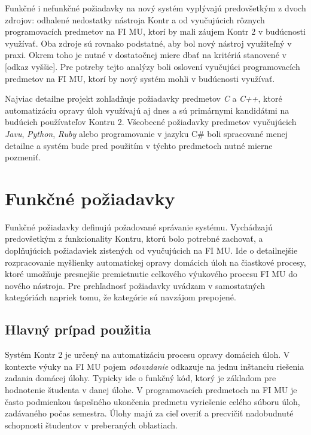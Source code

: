 \documentclass[
  digital, %
  twoside, %
  table,   %
  lof,     %
  lot,     %
]{fithesis3}
\begin{document}
Funkčné i nefunkčné požiadavky na nový systém vyplývajú predovšetkým z dvoch zdrojov: odhalené nedostatky nástroja Kontr a od vyučujúcich rôznych programovacích predmetov na FI MU, ktorí by mali záujem Kontr 2 v budúcnosti využívať. Oba zdroje sú rovnako podstatné, aby bol nový nástroj využiteľný v praxi. Okrem toho je nutné v dostatočnej miere dbať na kritériá stanovené v [odkaz vyššie]. Pre potreby tejto analýzy boli oslovení vyučujúci programovacích predmetov na FI MU, ktorí by nový systém mohli v budúcnosti využívať. 

Najviac detailne projekt zohľadňuje požiadavky predmetov \emph{C} a \emph{C++}, ktoré automatizáciu opravy úloh využívajú aj dnes a sú primárnymi kandidátmi na budúcich používateľov Kontru 2. Všeobecné požiadavky predmetov vyučujúcich \emph{Javu}, \emph{Python}, \emph{Ruby} alebo programovanie v jazyku C\# boli spracované menej detailne a systém bude pred použitím v týchto predmetoch nutné mierne pozmeniť.

\section{Funkčné požiadavky}

Funkčné požiadavky definujú požadované správanie systému. Vychádzajú predovšetkým z funkcionality Kontru, ktorú bolo potrebné zachovať, a doplňujúcich požiadaviek zistených od vyučujúcich na FI MU. Ide o detailnejšie rozpracovanie myšlienky automatickej opravy domácich úloh na čiastkové procesy, ktoré umožňuje presnejšie premietnutie celkového výukového procesu FI MU do nového nástroja. Pre prehľadnosť požiadavky uvádzam v samostatných kategóriách napriek tomu, že kategórie sú navzájom prepojené.

\subsection{Hlavný prípad použitia}

Systém Kontr 2 je určený na automatizáciu procesu opravy domácich úloh. V kontexte výuky na FI MU pojem \textit{odovzdanie} odkazuje na jednu inštanciu riešenia zadania domácej úlohy. Typicky ide o funkčný kód, ktorý je základom pre hodnotenie študenta v danej úlohe. V programovacích predmetoch na FI MU je často podmienkou úspešného ukončenia predmetu vyriešenie celého súboru úloh, zadávaného počas semestra. Úlohy majú za cieľ overiť a precvičiť nadobudnuté schopnosti študentov v preberaných oblastiach. 
\end{document}
